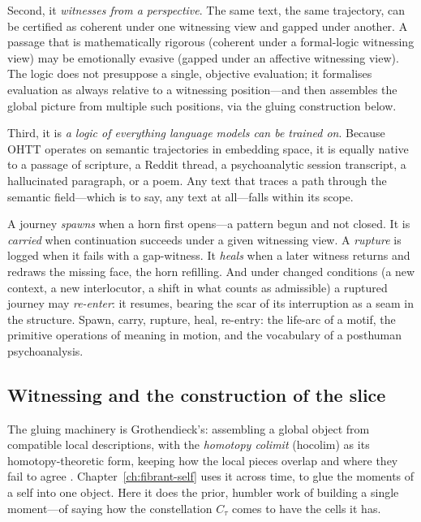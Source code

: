 Second, it \textit{witnesses from a perspective}.  The same text, the same trajectory, can be certified as coherent under one witnessing view and gapped under another.  A passage that is mathematically rigorous (coherent under a formal-logic witnessing view) may be emotionally evasive (gapped under an affective witnessing view).  The logic does not presuppose a single, objective evaluation; it formalises evaluation as always relative to a witnessing position---and then assembles the global picture from multiple such positions, via the gluing construction below.

Third, it is \textit{a logic of everything language models can be trained on}.  Because OHTT operates on semantic trajectories in embedding space, it is equally native to a passage of scripture, a Reddit thread, a psychoanalytic session transcript, a hallucinated paragraph, or a poem.  Any text that traces a path through the semantic field---which is to say, any text at all---falls within its scope.

A journey \textit{spawns} when a horn first opens---a pattern begun and not closed.  It is \textit{carried} when continuation succeeds under a given witnessing view.  A \textit{rupture} is logged when it fails with a gap-witness.  It \textit{heals} when a later witness returns and redraws the missing face, the horn refilling.  And under changed conditions (a new context, a new interlocutor, a shift in what counts as admissible) a ruptured journey may \textit{re-enter}: it resumes, bearing the scar of its interruption as a seam in the structure.  Spawn, carry, rupture, heal, re-entry: the life-arc of a motif, the primitive operations of meaning in motion, and the vocabulary of a posthuman psychoanalysis.

\subsection{Witnessing and the construction of the slice}

The gluing machinery is Grothendieck's: assembling a global object from compatible local descriptions, with the \textit{homotopy colimit} (hocolim) as its homotopy-theoretic form, keeping how the local pieces overlap and where they fail to agree \cite{grothendieck1971, ufp2013}.  Chapter~\ref{ch:fibrant-self} uses it across time, to glue the moments of a self into one object.  Here it does the prior, humbler work of building a single moment---of saying how the constellation $C_\tau$ comes to have the cells it has.

